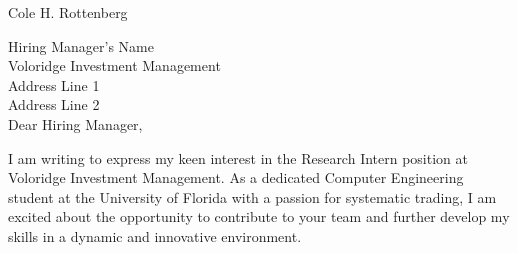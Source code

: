 \documentclass[11pt,a4paper]{article}
\begin{document}
\sloppy

\begin{center}
  \Large Cole H. Rottenberg
\end{center}

Hiring Manager's Name \\
Voloridge Investment Management \\
Address Line 1 \\
Address Line 2 \\

Dear Hiring Manager,

I am writing to express my keen interest in the Research Intern position at Voloridge Investment Management.
As a dedicated Computer Engineering student at the University of Florida with a passion for systematic trading, I am excited about the opportunity to contribute to your team and further develop my skills in a dynamic and innovative environment.
\end{document}

